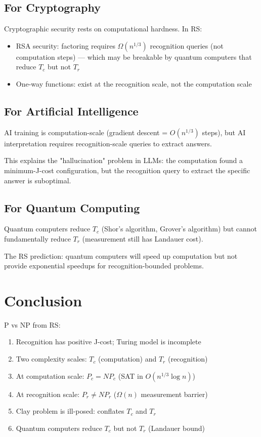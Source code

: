 \documentclass[12pt,a4paper]{article}
\theoremstyle{definition}
\theoremstyle{remark}
\begin{document}
\subsection{For Cryptography}

Cryptographic security rests on computational hardness. In RS:
\begin{itemize}
\item RSA security: factoring requires $\Omega(n^{1/3})$ recognition queries
(not computation steps) — which may be breakable by quantum computers 
that reduce $T_c$ but not $T_r$
\item One-way functions: exist at the recognition scale, not the computation scale
\end{itemize}

\subsection{For Artificial Intelligence}

AI training is computation-scale (gradient descent = $O(n^{1/3})$ steps), 
but AI interpretation requires recognition-scale queries to extract answers.

This explains the "hallucination" problem in LLMs: the computation found a 
minimum-J-cost configuration, but the recognition query to extract the specific 
answer is suboptimal.

\subsection{For Quantum Computing}

Quantum computers reduce $T_c$ (Shor's algorithm, Grover's algorithm) but 
cannot fundamentally reduce $T_r$ (measurement still has Landauer cost). 

The RS prediction: quantum computers will speed up computation but not provide 
exponential speedups for recognition-bounded problems.

\section{Conclusion}

P vs NP from RS:
\begin{enumerate}
\item Recognition has positive J-cost; Turing model is incomplete
\item Two complexity scales: $T_c$ (computation) and $T_r$ (recognition)
\item At computation scale: $P_c = NP_c$ (SAT in $O(n^{1/3}\log n)$)
\item At recognition scale: $P_r \neq NP_r$ ($\Omega(n)$ measurement barrier)
\item Clay problem is ill-posed: conflates $T_c$ and $T_r$
\item Quantum computers reduce $T_c$ but not $T_r$ (Landauer bound)
\end{enumerate}
\end{document}
